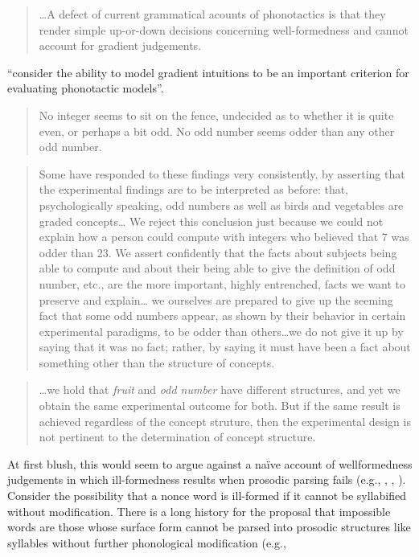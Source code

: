 \begin{quote}
\ldots{}A defect of current grammatical acounts of phonotactics is that they render simple up-or-down decisions concerning well-formedness and cannot account for gradient judgements. \citep[371]{Shademan2006}
\end{quote}

\citet[382]{Hayes2008a} ``consider the ability to model gradient intuitions to be an important criterion for evaluating phonotactic models''.

\begin{quote}
No integer seems to sit on the fence, undecided as to whether it is quite even, or perhaps a bit odd. No odd number seems odder than any other odd number. \citep[274]{Armstrong1983}
\end{quote}

\begin{quote}
Some have responded to these findings very consistently, by asserting that the experimental findings are to be interpreted as before: that, psychologically speaking, odd numbers as well as birds and vegetables are graded concepts\ldots{} We reject this conclusion just because we could not explain how a person could compute with integers who believed that 7 was odder than 23. We assert confidently that the facts about subjects being able to compute and about their being able to give the definition of odd number, etc., are the more important, highly entrenched, facts we want to preserve and explain\ldots{} we ourselves are prepared to give up the seeming fact that some odd numbers appear, as shown by their behavior in certain experimental paradigms, to be odder than others\ldots{}we do not give it up by saying that it was no fact; rather, by saying it must have been a fact about something other than the structure of concepts. \citep[284]{Armstrong1983}
\end{quote}

\begin{quote}
\ldots{}we hold that \emph{fruit} and \emph{odd number} have different structures, and yet we obtain the same experimental outcome for both. But if the same result is achieved regardless of the concept struture, then the experimental design is not pertinent to the determination of concept structure. \citep[284--5]{Armstrong1983}
\end{quote}

At first blush, this would seem to argue against a naïve account of wellformedness judgements in which ill-formedness results when prosodic parsing fails (e.g., \citealt{Ito1989a}, \citealt{Noske1992}, \citealt{OT}). Consider the possibility that a nonce word is ill-formed if it cannot be syllabified without modification. There is a long history for the proposal that impossible words are those whose surface form cannot be parsed into prosodic structures like syllables without further phonological modification (e.g., 

